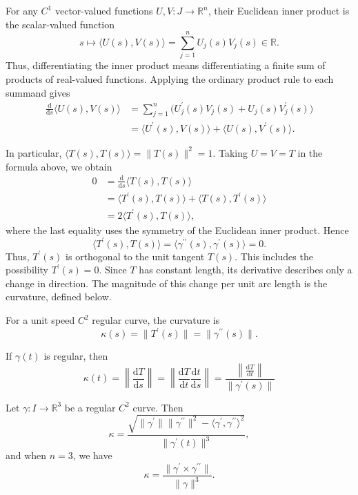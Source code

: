 For any \(C^1\) vector-valued functions \(U,V : J \to \mathbb{R}^n\), their Euclidean inner product is the scalar-valued function
\[
    s \longmapsto \langle U(s), V(s) \rangle
    = \sum_{j=1}^n U_j(s)V_j(s) \in \mathbb{R}.
\]
Thus, differentiating the inner product means differentiating a finite sum of products of real-valued functions. Applying the ordinary product rule to each summand gives
\begin{align*}
    \frac{\mathrm{d}}{\mathrm{d}s} \langle U(s), V(s) \rangle
    &= \sum_{j=1}^n \bigl(U_j^{\prime}(s)V_j(s) + U_j(s)V_j^{\prime}(s)\bigr) \\
    &= \langle U^{\prime}(s), V(s) \rangle
       + \langle U(s), V^{\prime}(s) \rangle.
\end{align*}

In particular, \(\langle T(s), T(s) \rangle = \lVert T(s) \rVert^2 = 1\). Taking \(U=V=T\) in the formula above, we obtain
\begin{align*}
    0 &= \frac{\mathrm{d}}{\mathrm{d}s} \langle T(s), T(s) \rangle \\
      &= \langle T^{\prime}(s), T(s) \rangle + \langle T(s), T^{\prime}(s) \rangle \\
      &= 2\langle T^{\prime}(s), T(s) \rangle,
\end{align*}
where the last equality uses the symmetry of the Euclidean inner product. Hence
\[
    \langle T^{\prime}(s), T(s) \rangle
    = \langle \gamma^{\prime\prime}(s), \gamma^{\prime}(s) \rangle = 0.
\]
Thus, \(T^{\prime}(s)\) is orthogonal to the unit tangent \(T(s)\). This includes the possibility \(T^{\prime}(s)=0\). Since \(T\) has constant length, its derivative describes only a change in direction. The magnitude of this change per unit arc length is the curvature, defined below.

\begin{definition}
    For a unit speed \(C^2\) regular curve, the curvature is
    \[
        \kappa(s) = \lVert T^{\prime} (s) \rVert = \lVert \gamma ^{\prime\prime} (s) \rVert.  
    \] 
\end{definition}

\begin{remark}
    If \(\gamma (t)\) is regular, then 
    \[
        \kappa (t) = \left\lVert \frac{\mathrm{d}T}{\mathrm{d}s}  \right\rVert = \left\lVert \frac{\mathrm{d}T}{\mathrm{d}t} \frac{\mathrm{d}t}{\mathrm{d}s} \right\rVert  = \frac{\left\lVert \frac{\mathrm{d}T}{\mathrm{d}t}  \right\rVert }{\lVert \gamma ^{\prime} (s) \rVert }
    \] 
\end{remark}

\begin{proposition}
    Let \(\gamma :I \to \mathbb{R}^3 \) be a regular \(C^2\) curve. Then 
    \[
        \kappa = \frac{\sqrt{\lVert \gamma ^{\prime}  \rVert \lVert \gamma ^{\prime\prime}  \rVert^2 - \langle \gamma ^{\prime} , \gamma ^{\prime\prime}  \rangle^2   } }{\lVert \gamma ^{\prime} (t) \rVert^3 },
    \]  
    and when \(n = 3\), we have 
    \[
        \kappa = \frac{\lVert \gamma ^{\prime} \times \gamma ^{\prime\prime}  \rVert }{\lVert \gamma  \rVert^3 }.
    \] 
\end{proposition}